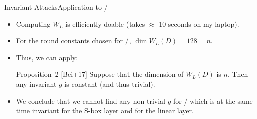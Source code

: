 \begin{frame}{Invariant Attacks}{Application to \clyde/}
    \begin{itemize}
        \item Computing $W_L$ is efficiently doable (takes $\approx$ 10 seconds on my laptop).
        \item For the round constants chosen for \clyde/, $\dim W_L(D) = 128 = n$.
    \end{itemize}
    \begin{itemize}
        \item Thus, we can apply:
              \begin{block}{Proposition~2 [Bei+17]}
                  Suppose that the dimension of $W_L(D)$ is $n$.
                  Then any invariant $g$ is constant (and thus trivial).
              \end{block}
    \end{itemize}
    \begin{itemize}
        \item We conclude that we cannot find any non-trivial $g$ for \clyde/ which is at the same time invariant for the S-box layer and for the linear layer.
    \end{itemize}
\end{frame}


